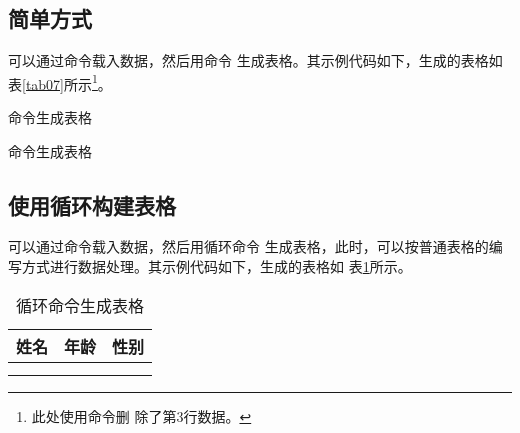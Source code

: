 \documentclass[scheme=chinese, heading = true, UTF8]{ctexart}
\begin{document}
  \subsection{简单方式}
  可以通过命令载入\csv 数据，然后用命令
  生成表格。其示例代码如下，生成的表格如
  表\ref{tab07}所示\footnote{此处使用命令删
    除了第3行数据。}。

  \begin{center}
    \begin{minipage}[h]{0.9\linewidth}
      \begin{codeonly}
        \begin{table}[htb]
          \centering    
          \caption{命令生成表格\label{tab07}}          
      \end{table}
      \end{codeonly}
    \end{minipage}
  \end{center}

  \begin{table}[htb]
    \centering
    \caption{命令生成表格\label{tab07}}
  \end{table}

  \subsection{使用循环构建表格}
  可以通过命令载入\csv 数据，然后用循环命令
  生成表格，此时，可以按普通表格的编写方式进行数据处理。其示例代码如下，生成的表格如
  表\ref{tab08}所示。
  \begin{center}
    \begin{minipage}[h]{0.7\linewidth}
      \begin{codeonly}
        \begin{table}[htb]
          \centering    
          \caption{循环命令生成表格\label{tab08}}
          \begin{tabular}{llc}
            \toprule
            姓名 & 年龄 & 性别 \tabularnewline
            \midrule
            \DTLforeach*{table}{\name=name, \gender=gender, \age=age}%
              {\DTLiffirstrow{}{\tabularnewline}%
              \name & \age & \gender}\\ %
            \bottomrule
          \end{tabular}  
        \end{table}
      \end{codeonly}
    \end{minipage}
  \end{center}
  
\end{document}
